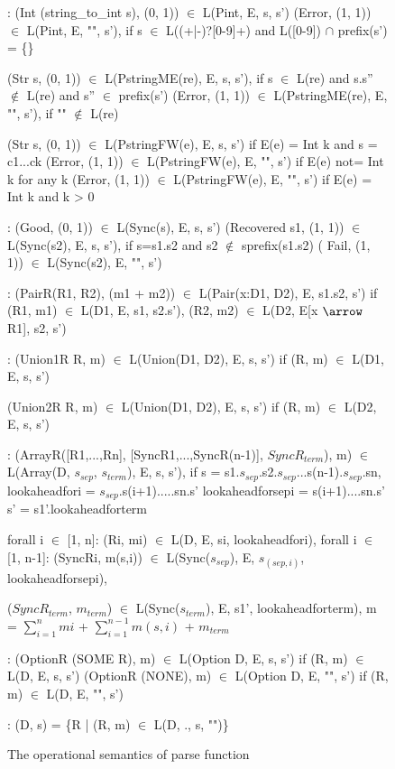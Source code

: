 \begin{figure*}[ht]
\begin{center}
{\small
\begin{code}
\cdmath
{}:
  (Int (string\_to\_int s), (0, 1)) $\in$ L(Pint, E, s, s')
  (Error, (1, 1)) $\in$ L(Pint, E, "", s'), 
  if s $\in$ L((+|-)?[0-9]+) and L([0-9]) $\cap$ prefix(s') = \{\}

  (Str s, (0, 1)) $\in$ L(PstringME(re), E, s, s'),
	if s $\in$ L(re) and s.s'' $\not\in$ L(re) and s'' $\in$ prefix(s') 
  (Error, (1, 1)) $\in$ L(PstringME(re), E, "", s'), if "" $\not\in$ L(re)

  (Str s, (0, 1)) $\in$ L(PstringFW(e), E, s, s') if E(e) = Int k and s = c1...ck
  (Error, (1, 1)) $\in$ L(PstringFW(e), E, "", s') if E(e) not= Int k for any k
  (Error, (1, 1)) $\in$ L(PstringFW(e), E, "", s') if E(e) = Int k and k > 0

:
  (Good, (0, 1)) $\in$ L(Sync(s), E, s, s')
  (Recovered s1, (1, 1)) $\in$ L(Sync(s2), E, s, s'), if s=s1.s2 and s2 $\not\in$ sprefix(s1.s2)
(  Fail, (1, 1)) $\in$ L(Sync(s2), E, "", s')

:
  (PairR(R1, R2), (m1 + m2)) $\in$ L(Pair(x:D1, D2), E, s1.s2, s')
        if (R1, m1) $\in$ L(D1, E, s1, s2.s'),
           (R2, m2) $\in$ L(D2, E[x $\arrow$ R1], s2, s')

:
  (Union1R R, m) $\in$ L(Union(D1, D2), E, s, s')
        if (R, m) $\in$ L(D1, E, s, s')

  (Union2R R, m) $\in$ L(Union(D1, D2), E, s, s')
        if (R, m) $\in$ L(D2, E, s, s')

:
  (ArrayR([R1,...,Rn], [SyncR1,...,SyncR(n-1)], $SyncR_{term}$), m)
    $\in$ L(Array(D, $s_{sep}$, $s_{term}$), E, s, s'),
        if
        s = s1.$s_{sep}$.s2.$s_{sep}$...s(n-1).$s_{sep}$.sn,
        lookaheadfori = $s_{sep}$.s(i+1).....sn.s'
        lookaheadforsepi = s(i+1)....sn.s'
        s' = s1'.lookaheadforterm

        forall i $\in$ [1, n]:
          (Ri, mi) $\in$ L(D, E, si, lookaheadfori),
        forall i $\in$ [1, n-1]:
          (SyncRi, m(s,i)) $\in$ L(Sync($s_{sep}$), E, $s_{(sep,i)}$, lookaheadforsepi),

        ($SyncR_{term}$, $m_{term}$) $\in$ L(Sync($s_{term}$), E, s1', lookaheadforterm),
        m = $\sum_{i= 1}^{n} mi$ + $\sum_{i=1}^{n-1} m(s,i)$ + $m_{term}$

:
  (OptionR (SOME R), m) $\in$ L(Option D, E, s, s')
	if (R, m) $\in$ L(D, E, s, s')
  (OptionR (NONE), m) $\in$ L(Option D, E, "", s')
	if (R, m) $\in$ L(D, E, "", s')

:
  (D, s) = \{R | (R, m) $\in$ L(D, ., s, "")\} 
\end{code}
}
\caption{The operational semantics of parse function}
\label{fig:parse-sem}
\end{center}
\end{figure*}

